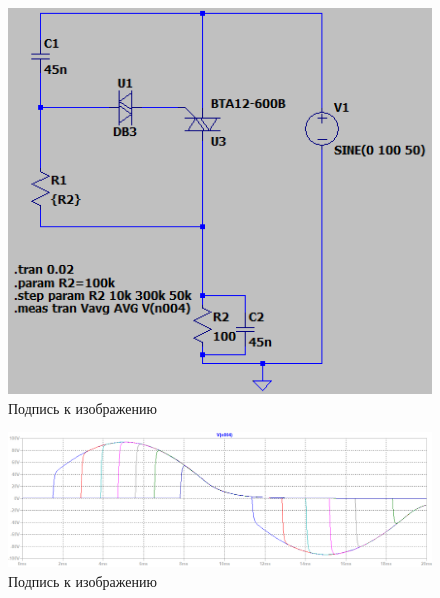 \documentclass[a4paper, 12pt]{article}
\begin{document}
    \begin{figure}[H]
        \centering
        \includegraphics[scale=0.8]{scheme6.png}
        \captionsetup{skip=0pt}
        \caption{Подпись к изображению}
        \label{fig:scheme6}
    \end{figure}


    \begin{figure}[H]
        \centering
        \includegraphics[scale=0.45]{R2-all_C10u.png}
        \captionsetup{skip=0pt}
        \caption{Подпись к изображению}
        \label{fig:R2-all_C10u}
    \end{figure}
\end{document}
